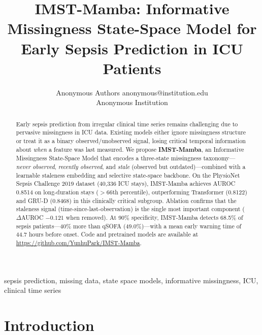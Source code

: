 \documentclass[twoside,11pt]{article}
\begin{document}
\title{IMST-Mamba: Informative Missingness State-Space Model for Early Sepsis
       Prediction in ICU Patients}

\author{\name Anonymous Authors \email anonymous@institution.edu \\
        \addr Anonymous Institution}


\maketitle

\begin{abstract}
Early sepsis prediction from irregular clinical time series remains challenging
due to pervasive missingness in ICU data.  Existing models either ignore
missingness structure or treat it as a binary observed/unobserved signal,
losing critical temporal information about \emph{when} a feature was last
measured.  We propose \textbf{IMST-Mamba}, an Informative Missingness
State-Space Model that encodes a three-state missingness taxonomy—\emph{never
observed}, \emph{recently observed}, and \emph{stale} (observed but
outdated)—combined with a learnable staleness embedding and selective
state-space backbone.  On the PhysioNet Sepsis Challenge 2019 dataset
(40,336 ICU stays), IMST-Mamba achieves AUROC 0.8514 on long-duration stays
($>$66th percentile), outperforming Transformer (0.8122) and GRU-D (0.8468) in
this clinically critical subgroup.  Ablation confirms that the staleness signal
(time-since-last-observation) is the single most important component
($\Delta$AUROC $-0.121$ when removed).  At 90\% specificity, IMST-Mamba
detects 68.5\% of sepsis patients—40\% more than qSOFA (49.0\%)—with a mean
early warning time of 44.7 hours before onset.  Code and pretrained models are
available at \url{https://github.com/YunhuPark/IMST-Mamba}.
\end{abstract}

\begin{keywords}
sepsis prediction, missing data, state space models, informative missingness,
ICU, clinical time series
\end{keywords}

\section{Introduction}
\label{sec:intro}
\end{document}
